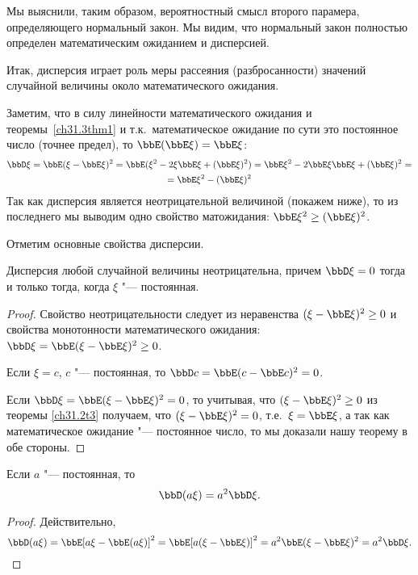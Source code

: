 Мы выяснили, таким образом, вероятностный смысл второго парамера, определяющего нормальный закон. Мы видим, что нормальный закон полностью определен математическим ожиданием и дисперсией. 

Итак, дисперсия играет роль меры рассеяния (разбросанности) значений случайной величины около математического ожидания.

Заметим, что в силу линейности математического ожидания и теоремы~\ref{ch31.3thm1} и т.к.~математическое ожидание по сути это постоянное число (точнее предел), то $\bbE(\bbE\xi)=\bbE\xi$:
\begin{multline*}
\bbD\xi = \bbE(\xi-\bbE\xi)^2=\bbE(\xi^2-2\xi \bbE\xi+(\bbE\xi)^2)=\bbE\xi^2-2\bbE\xi \bbE\xi+(\bbE\xi)^2=\\=\bbE\xi^2-(\bbE\xi)^2
\end{multline*}
Так как дисперсия является неотрицательной величиной (покажем ниже), то из последнего мы выводим одно свойство матожидания: $\bbE\xi^2\ge(\bbE\xi)^2$.



Отметим основные свойства дисперсии.

\begin{thm} Дисперсия любой случайной величины неотрицательна, причем $\bbD\xi = 0$ тогда и только тогда, когда $\xi$ "--- постоянная. 
\end{thm}
\begin{proof}
Свойство неотрицательности следует из неравенства $(\xi - \bbE \xi)^2 \ge 0$ и свойства монотонности математического ожидания: $\bbD \xi = \bbE (\xi - \bbE \xi)^2 \ge 0$.

Если $\xi = c$, $c$ "--- постоянная, то $\bbD c = \bbE (c - \bbE c)^2 = 0$. 

Если $\bbD\xi=\bbE (\xi - \bbE \xi)^2=0$, то учитывая, что $(\xi - \bbE \xi)^2\ge 0$ из теоремы \ref{ch31.2t3} получаем, что $(\xi - \bbE \xi)^2=0$, т.е.~$\xi=\bbE\xi$, а так как математическое ожидание "--- постоянное число, то мы доказали нашу теорему в обе стороны.
\end{proof}
\begin{thm} Если $a$ "--- постоянная, то $$\bbD(a\xi) = a^2 \bbD\xi.$$
\end{thm}
\begin{proof}
Действительно, 
\begin{equation*}
\bbD(a\xi) = \bbE[a\xi - \bbE (a\xi)]^2 = \bbE [a (\xi - \bbE \xi)]^2 = a^2\bbE(\xi - \bbE\xi)^2 = a^2 \bbD\xi. \qedhere
\end{equation*}
\end{proof}

